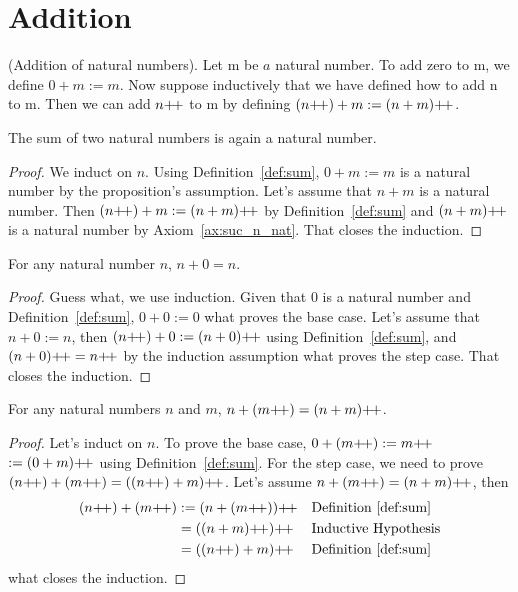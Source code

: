 \section{Addition}

\begin{definition}
     (Addition of natural numbers). Let m be $a$ natural number. To add zero to m, 
     we define $0 + m := m$. Now suppose inductively that we have defined how to add n to m. 
     Then we can add $n\operatorname{\!+\!+}$ to m by defining $(n\operatorname{\!+\!+}) + m := (n + m)\operatorname{\!+\!+}$.\label{def:sum}
\end{definition}

\begin{subsequence}
    \begin{proposition}
    The sum of two natural numbers is again a natural number.\label{prop:sum_nat_is_nat}
    \end{proposition}    
\end{subsequence}

\begin{proof}
    We induct on $n$. Using Definition~\ref{def:sum}, $0+m:=m$ is a natural number by the proposition's assumption. Let's assume that $n+m$ is a natural number. Then $(n\operatorname{\!+\!+})+m:=(n+m)\operatorname{\!+\!+}$ by Definition~\ref{def:sum} and $(n+m)\operatorname{\!+\!+}$ is a natural number by Axiom~\ref{ax:suc_n_nat}. That closes the induction.
\end{proof}

\begin{lemma}
    For any natural number $n$, $n+0=n$.\label{lem:sum_zero_commutative}
\end{lemma}

\begin{proof}
    Guess what, we use induction. Given that $0$ is a natural number and Definition~\ref{def:sum}, $0+0:=0$ what proves the base case. Let's assume that $n+0:=n$, then $(n\operatorname{\!+\!+})+0:=(n+0)\operatorname{\!+\!+}$ using Definition~\ref{def:sum}, and $(n+0)\operatorname{\!+\!+}=n\operatorname{\!+\!+}$ by the induction assumption what proves the step case. That closes the induction. 
\end{proof}

\begin{lemma}
    For any natural numbers $n$ and $m$, $n+(m\operatorname{\!+\!+})= (n+m)\operatorname{\!+\!+}$.\label{lem:suc_commutative}
\end{lemma}
\begin{proof}
    Let's induct on $n$. To prove the base case, $0+(m\operatorname{\!+\!+}):= m\operatorname{\!+\!+}$ $:=(0+m)\operatorname{\!+\!+}$ using Definition~\ref{def:sum}. For the step case, we need to prove $\left(n\next\right)+(m\next)=((n\next)+m)\next$. Let's assume $n+(m\operatorname{\!+\!+}) = (n+m)\operatorname{\!+\!+}$, then
    \begin{align*}
        (n\next)+(m\next)&:= (n+(m\next))\next &&\text{Definition~\ref{def:sum}}\\
        & =((n+m)\next)\next &&\text{Inductive Hypothesis}\\
        & = ((n\next)+m)\next &&\text{Definition~\ref{def:sum}}
    \end{align*}
    what closes the induction.
\end{proof}

